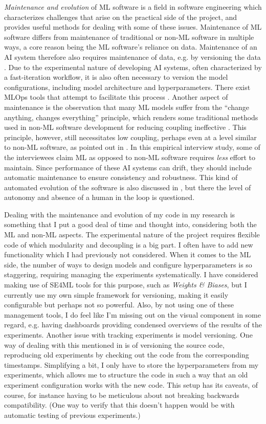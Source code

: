 \documentclass[11pt]{article}
\begin{document}
\textit{Maintenance and evolution} of ML software is a field in software engineering which characterizes challenges that arise on the practical side of the project, and provides useful methods for dealing with some of these issues. Maintenance of ML software differs from maintenance of traditional or non-ML software in multiple ways, a core reason being the ML software's reliance on data. Maintenance of an AI system therefore also requires maintenance of data, e.g. by versioning the data \cite{Giray2021}. Due to the experimental nature of developing AI systems, often characterized by a fast-iteration workflow, it is also often necessary to version the model configurations, including model architecture and hyperparameters. There exist MLOps tools that attempt to facilitate this process \cite{Giray2021}. Another aspect of maintenance is the observation that many ML models suffer from the ``change anything, changes everything'' principle, which renders some traditional methods used in non-ML software development for reducing coupling ineffective \cite{Giray2021}. This principle, however, still necessitates low coupling, perhaps even at a level similar to non-ML software, as pointed out in \cite{Wan2019}. In this empirical interview study, some of the interviewees claim ML as opposed to non-ML software requires \textit{less} effort to maintain. Since performance of these AI systems can drift, they should include automatic maintenance to ensure consistency and robustness. This kind of automated evolution of the software is also discussed in \cite{Giray2021}, but there the level of autonomy and absence of a human in the loop is questioned.

Dealing with the maintenance and evolution of my code in my research is something that I put a good deal of time and thought into, considering both the ML and non-ML aspects. The experimental nature of the project requires flexible code of which modularity and decoupling is a big part. I often have to add new functionality which I had previously not considered. When it comes to the ML side, the number of ways to design models and configure hyperparameters is so staggering, requiring managing the experiments systematically. I have considered making use of SE4ML tools for this purpose, such as \textit{Weights \& Biases}, but I currently use my own simple framework for versioning, making it easily configurable but perhaps not so powerful. Also, by not using one of these management tools, I do feel like I'm missing out on the visual component in some regard, e.g. having dashboards providing condensed overviews of the results of the experiments. Another issue with tracking experiments is model versioning. One way of dealing with this mentioned in \cite{Giray2021} is of versioning the source code, reproducing old experiments by checking out the code from the corresponding timestamps. Simplifying a bit, I only have to store the hyperparameters from my experiments, which allows me to structure the code in such a way that an old experiment configuration works with the new code. This setup has its caveats, of course, for instance having to be meticulous about not breaking backwards compatibility. (One way to verify that this doesn't happen would be with automatic testing of previous experiments.)
\end{document}
